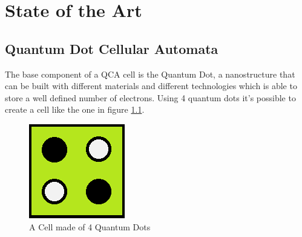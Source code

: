 \chapter{State of the Art}\label{sec:state_of_art}
\section{Quantum Dot Cellular Automata}
The base component of a QCA cell is the Quantum Dot, a nanostructure that can be built with different materials and different technologies which is able to store a well defined number of electrons. Using 4 quantum dots it's possible to create a cell like the one in figure \ref{img:cell}. 

\begin{figure}
\centering
\includegraphics[scale=0.8]{img/_Cell1.png}
\caption{A Cell made of 4 Quantum Dots}
\label{img:cell}
\end{figure}

